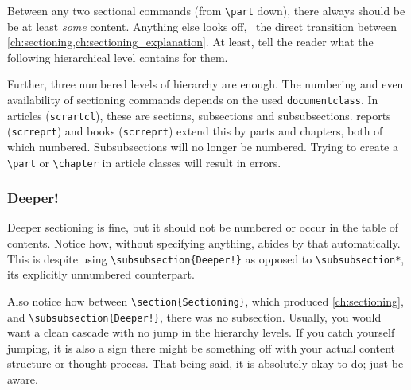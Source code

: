 Between any two sectional commands (from \verb|\part| down), there always should be
be at least \emph{some} content.
Anything else looks off, \ the direct transition between
\cref{ch:sectioning,ch:sectioning_explanation}.
At least, tell the reader what the following hierarchical level contains for them.

Further, three numbered levels of hierarchy are enough.
The numbering and even availability of sectioning commands depends on the used
\verb|documentclass|.
In  articles (\verb|scrartcl|), these are sections,
subsections and subsubsections.
 reports (\verb|scrreprt|) and books (\verb|scrreprt|)
extend this by parts and chapters, both of which numbered.
Subsubsections will no longer be numbered.
Trying to create a \verb|\part| or \verb|\chapter| in article classes will result
in errors.

\subsubsection{Deeper!}

Deeper sectioning is fine, but it should not be numbered or occur in the table of
contents.
Notice how, without specifying anything,  abides by that
automatically.
This is despite using \verb|\subsubsection{Deeper!}| as opposed to \verb|\subsubsection*|,
its explicitly unnumbered counterpart.

Also notice how between \verb|\section{Sectioning}|, which produced \cref{ch:sectioning},
and \verb|\subsubsection{Deeper!}|, there was no subsection.
Usually, you would want a clean cascade with no jump in the hierarchy levels.
If you catch yourself jumping, it is also a sign there might be something off with your
actual content structure or thought process.
That being said, it is absolutely okay to do; just be aware.

